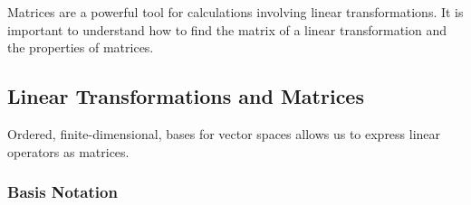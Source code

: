 \chapter{\matricesTitle}
\label{Matrices}

Matrices are a powerful tool for calculations involving linear transformations.
It is important to understand how to find the matrix of a linear transformation 
and the properties of matrices.

\section{Linear Transformations and Matrices}

Ordered, finite-dimensional, bases for  vector spaces allows us to express linear operators as matrices.

\subsection{Basis Notation}
\hypertarget{Basis notation}{~}

